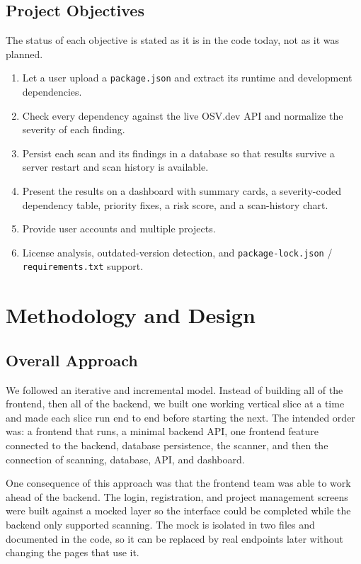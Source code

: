 \documentclass[12pt,a4paper]{report}
\begin{document}
\section{Project Objectives}
The status of each objective is stated as it is in the code today, not as it was planned.
\begin{enumerate}[leftmargin=*]
  \item Let a user upload a \texttt{package.json} and extract its runtime and development dependencies. 
  \item Check every dependency against the live OSV.dev API and normalize the severity of each finding. 
  \item Persist each scan and its findings in a database so that results survive a server restart and scan history is available. 
  \item Present the results on a dashboard with summary cards, a severity-coded dependency table, priority fixes, a risk score, and a scan-history chart. 
  \item Provide user accounts and multiple projects. 
  \item License analysis, outdated-version detection, and \texttt{package-lock.json} / \texttt{requirements.txt} support. 
\end{enumerate}

\chapter{Methodology and Design}

\section{Overall Approach}
We followed an iterative and incremental model. Instead of building all of the frontend, then all of the backend, we built one working vertical slice at a time and made each slice run end to end before starting the next. The intended order was: a frontend that runs, a minimal backend API, one frontend feature connected to the backend, database persistence, the scanner, and then the connection of scanning, database, API, and dashboard.

One consequence of this approach was that the frontend team was able to work ahead of the backend. The login, registration, and project management screens were built against a mocked layer so the interface could be completed while the backend only supported scanning. The mock is isolated in two files and documented in the code, so it can be replaced by real endpoints later without changing the pages that use it.
\end{document}
